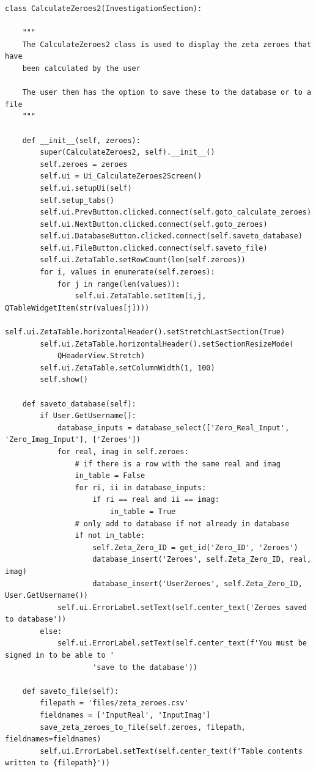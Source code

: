 \documentclass{article}
\begin{document}
\begin{lstlisting}
class CalculateZeroes2(InvestigationSection):

    """
    The CalculateZeroes2 class is used to display the zeta zeroes that have
    been calculated by the user

    The user then has the option to save these to the database or to a file
    """

    def __init__(self, zeroes):
        super(CalculateZeroes2, self).__init__()
        self.zeroes = zeroes
        self.ui = Ui_CalculateZeroes2Screen()
        self.ui.setupUi(self)
        self.setup_tabs()
        self.ui.PrevButton.clicked.connect(self.goto_calculate_zeroes)
        self.ui.NextButton.clicked.connect(self.goto_zeroes)
        self.ui.DatabaseButton.clicked.connect(self.saveto_database)
        self.ui.FileButton.clicked.connect(self.saveto_file)
        self.ui.ZetaTable.setRowCount(len(self.zeroes))
        for i, values in enumerate(self.zeroes):
            for j in range(len(values)):
                self.ui.ZetaTable.setItem(i,j, QTableWidgetItem(str(values[j])))
        self.ui.ZetaTable.horizontalHeader().setStretchLastSection(True)
        self.ui.ZetaTable.horizontalHeader().setSectionResizeMode(
            QHeaderView.Stretch)
        self.ui.ZetaTable.setColumnWidth(1, 100)
        self.show()

    def saveto_database(self):
        if User.GetUsername():
            database_inputs = database_select(['Zero_Real_Input', 'Zero_Imag_Input'], ['Zeroes'])
            for real, imag in self.zeroes:
                # if there is a row with the same real and imag
                in_table = False
                for ri, ii in database_inputs:
                    if ri == real and ii == imag:
                        in_table = True
                # only add to database if not already in database
                if not in_table:
                    self.Zeta_Zero_ID = get_id('Zero_ID', 'Zeroes')
                    database_insert('Zeroes', self.Zeta_Zero_ID, real, imag)
                    database_insert('UserZeroes', self.Zeta_Zero_ID, User.GetUsername())
            self.ui.ErrorLabel.setText(self.center_text('Zeroes saved to database'))
        else:
            self.ui.ErrorLabel.setText(self.center_text(f'You must be signed in to be able to '
                    'save to the database'))

    def saveto_file(self):
        filepath = 'files/zeta_zeroes.csv'
        fieldnames = ['InputReal', 'InputImag']
        save_zeta_zeroes_to_file(self.zeroes, filepath, fieldnames=fieldnames)
        self.ui.ErrorLabel.setText(self.center_text(f'Table contents written to {filepath}'))



\end{lstlisting}
\end{document}
